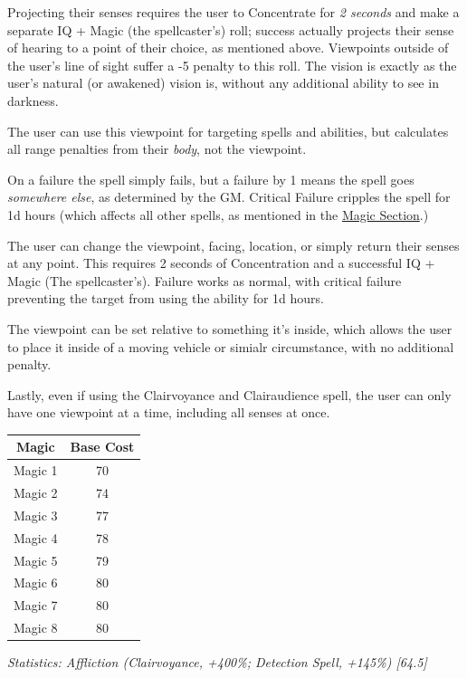 \begin{multicols}{3}
	Projecting their senses requires the user to Concentrate for \textit{2 seconds} and make a separate IQ + Magic (the spellcaster's) roll; success actually projects their sense of hearing to a point of their choice, as mentioned above. Viewpoints outside of the user's line of sight suffer a -5 penalty to this roll. The vision is exactly as the user's natural (or awakened) vision is, without any additional ability to see in darkness.
	
	The user can use this viewpoint for targeting spells and abilities, but calculates all range penalties from their \textit{body}, not the viewpoint.
	
	On a failure the spell simply fails, but a failure by 1 means the spell goes \textit{somewhere else}, as determined by the GM. Critical Failure cripples the spell for 1d hours (which affects all other spells, as mentioned in the \hyperref[magic]{Magic Section}.)
	
	The user can change the viewpoint, facing, location, or simply return their senses at any point. This requires 2 seconds of Concentration and a successful IQ + Magic (The spellcaster's). Failure works as normal, with critical failure preventing the target from using the ability for 1d hours.
	
	The viewpoint can be set relative to something it's inside, which allows the user to place it inside of a moving vehicle or simialr circumstance, with no additional penalty.
	
	Lastly, even if using the Clairvoyance and Clairaudience spell, the user can only have one viewpoint at a time, including all senses at once.
		
	\begin{center}
		\begin{tabular}{|c|c|}
			\hline
			Magic & Base Cost \\
			\hline
			\hline
			Magic 1 & 70 \\
			Magic 2 & 74 \\
			Magic 3 & 77 \\
			Magic 4 & 78 \\
			Magic 5 & 79 \\
			Magic 6 & 80 \\
			Magic 7 & 80 \\
			Magic 8 & 80 \\
			\hline
		\end{tabular}
	\end{center}
	
	\textcolor{OliveGreen}{\textit{ Statistics: Affliction (Clairvoyance, +400\%; Detection Spell, +145\%) [64.5]}}
	

\end{multicols}

